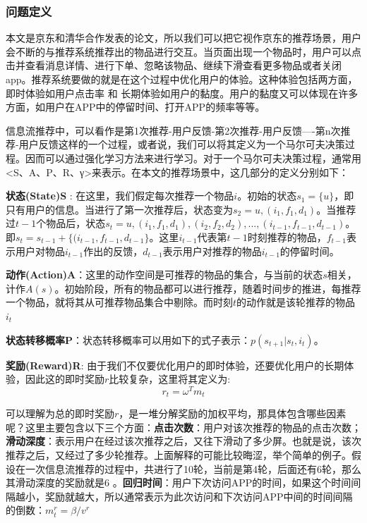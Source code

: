 \documentclass[12pt]{article}
\begin{document}
\subsubsection{问题定义}
本文是京东和清华合作发表的论文，所以我们可以把它视作京东的推荐场景，用户会不断的与推荐系统推荐出的物品进行交互。当页面出现一个物品时，用户可以点击并查看消息详情、进行下单、忽略该物品、继续下滑查看更多物品或者关闭app。推荐系统要做的就是在这个过程中优化用户的体验。这种体验包括两方面，即时体验如用户点击率 和 长期体验如用户的黏度。用户的黏度又可以体现在许多方面，如用户在APP中的停留时间、打开APP的频率等等。

信息流推荐中，可以看作是第1次推荐-用户反馈-第2次推荐-用户反馈----第n次推荐-用户反馈这样的一个过程，或者说，我们可以将其定义为一个马尔可夫决策过程。因而可以通过强化学习方法来进行学习。对于一个马尔可夫决策过程，通常用<S、A、P、R、γ>来表示。在本文的推荐场景中，这几部分的定义分别如下：

\textbf{状态(State)S} : 在这里，我们假定每次推荐一个物品$i$。初始的状态$s_1=\{u\}$，即只有用户的信息。当进行了第一次推荐后，状态变为$s_2={u,(i_1,f_1,d_1)}$。当推荐过$t-1$个物品后，状态$s_t = {u,(i_1,f_1,d_1),(i_2,f_2,d_2),...,(i_{t-1},f_{t-1},d_{t-1})}$。即$s_t = s_{t-1} + \{(i_{t-1},f_{t-1},d_{t-1}\}$。这里$i_{t-1}$代表第${t-1}$时刻推荐的物品，$f_{t-1}$表示用户对物品$i_{t-1}$作出的反馈，$d_{t-1}$表示用户对推荐的物品$i_{t-1}$的停留时间。

\textbf{动作(Action)A}：这里的动作空间是可推荐的物品的集合，与当前的状态$s$相关，计作$A(s)$。初始阶段，所有的物品都可以进行推荐，随着时间步的推进，每推荐一个物品，就将其从可推荐物品集合中剔除。而时刻$t$的动作就是该轮推荐的物品$i_t$

\textbf{状态转移概率P}：状态转移概率可以用如下的式子表示：$p(s_{t+1} | s_t,i_t)$。

\textbf{奖励(Reward)R}: 由于我们不仅要优化用户的即时体验，还要优化用户的长期体验，因此这的即时奖励$r$比较复杂，这里将其定义为:
$$
r_t = \omega^T m_t
$$

可以理解为总的即时奖励$r$，是一堆分解奖励的加权平均，那具体包含哪些因素呢？这里主要包含以下三个方面：\textbf{点击次数}：用户对该次推荐的物品的点击次数；\textbf{滑动深度}：表示用户在经过该次推荐之后，又往下滑动了多少屏。也就是说，该次推荐之后，又经过了多少轮推荐。上面解释的可能比较晦涩，举个简单的例子。假设在一次信息流推荐的过程中，共进行了10轮，当前是第4轮，后面还有6轮，那么其滑动深度的奖励就是6 。\textbf{回归时间}：用户下次访问APP的时间，如果这个时间间隔越小，奖励就越大，所以通常表示为此次访问和下次访问APP中间的时间间隔的倒数：$m_t^r = \beta / v^r$
\end{document}
